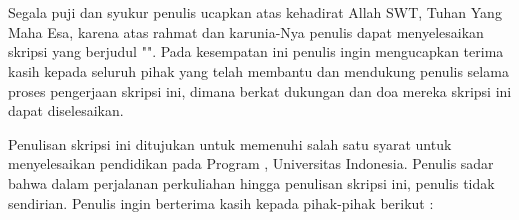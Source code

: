\chapter*{\kataPengantar}
Segala puji dan syukur penulis ucapkan atas kehadirat Allah SWT, Tuhan Yang Maha Esa, karena atas rahmat dan karunia-Nya penulis dapat menyelesaikan skripsi yang berjudul "\judul". Pada kesempatan ini penulis ingin mengucapkan terima kasih kepada seluruh pihak yang telah membantu dan mendukung penulis selama proses pengerjaan skripsi ini, dimana berkat dukungan dan doa mereka skripsi ini dapat diselesaikan.

Penulisan skripsi ini ditujukan untuk memenuhi salah satu syarat untuk menyelesaikan pendidikan pada Program \gelar, Universitas Indonesia. Penulis sadar bahwa dalam perjalanan perkuliahan hingga penulisan skripsi ini, penulis tidak sendirian. Penulis ingin berterima kasih kepada pihak-pihak berikut :

